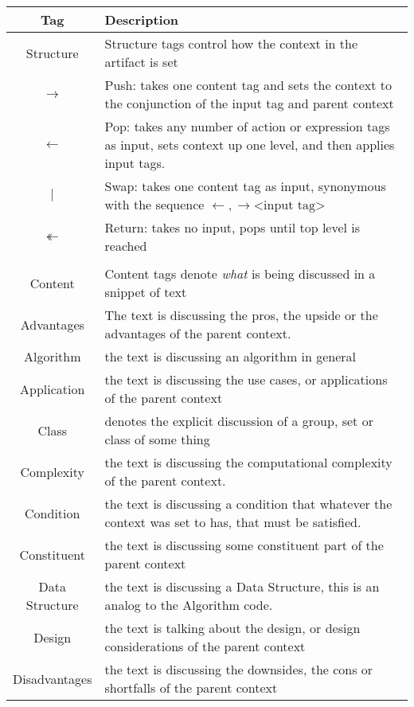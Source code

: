\begin{table}[h!]
  \centering
  \begin{tabular}{c p{1.8\linewidth}}
    Tag & Description \\
    \hline
    \hline

    Structure &  Structure tags control how the context in the artifact is set \\
    \hline
    $\rightarrow$ & Push: takes one content tag and sets the context to the conjunction of the input tag and parent context \\
    $\leftarrow$ & Pop: takes any number of action or expression tags as input, sets context up one level, and then applies input tags.\\
    $|$ & Swap: takes one content tag as input, synonymous with the sequence $\leftarrow, \rightarrow \text{<input tag>}$ \\
    $\twoheadleftarrow$ & Return: takes no input, pops until top level is reached \\
\\
    Content & Content tags denote \emph{what} is being discussed in a snippet of text \\
    \hline
    Advantages & The text is discussing the pros, the upside or the advantages of the parent context. \\
    Algorithm & the text is discussing an algorithm in general\\
    Application &  the text is discussing the use cases, or applications of the parent context\\
    Class & denotes the explicit discussion of a group, set or class of some thing\\
    Complexity & the text is discussing the computational complexity of the parent context.\\
    Condition & the text is discussing a condition that whatever the context was set to has, that must be satisfied.\\
    Constituent & the text is discussing some constituent part of the parent context\\
    Data Structure & the text is discussing a Data Structure, this is an analog to the Algorithm code.\\
    Design & the text is talking about the design, or design considerations of the parent context\\
    Disadvantages & the text is discussing the downsides, the cons or shortfalls of the parent context\\

\end{tabular}
\end{table}
